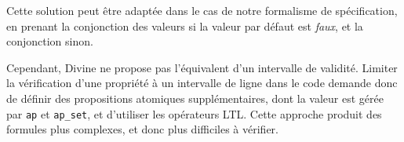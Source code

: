 Cette solution peut être adaptée dans le cas de notre formalisme de
spécification, en prenant la conjonction des valeurs si la valeur par défaut est
\emph{faux}, et la conjonction sinon.

Cependant, Divine ne propose pas l'équivalent d'un intervalle de validité.
Limiter la vérification d'une propriété à un intervalle de ligne dans le code
demande donc de définir des propositions atomiques supplémentaires, dont la
valeur est gérée par \texttt{ap} et \texttt{ap\_set}, et d'utiliser les
opérateurs \ac{LTL}. Cette approche produit des formules plus complexes, et donc
plus difficiles à vérifier.
